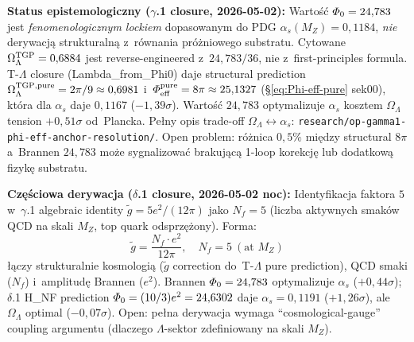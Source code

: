 \begin{proposition}
\medskip\noindent
\textbf{Status epistemologiczny ($\gamma$.1 closure, 2026-05-02):}
Warto\'s\'c $\PhiZero = 24{,}783$ jest \emph{fenomenologicznym lockiem}
dopasowanym do PDG $\alpha_s(M_Z) = 0{,}1184$, \emph{nie} derywacj\k{a}
strukturaln\k{a} z~r\'ownania pr\'o\.zniowego substratu.
Cytowane $\Omega_\Lambda^{\rm TGP} = 0{,}6884$ jest reverse-engineered
z~$24{,}783/36$, nie z~first-principles formula.
T-$\Lambda$ closure (Lambda\_from\_Phi0) daje structural prediction
$\Omega_\Lambda^{\rm TGP,pure} = 2\pi/9 \approx 0{,}6981$
i~$\Phi_{\mathrm{eff}}^{\rm pure} = 8\pi \approx 25{,}1327$
(\S\ref{eq:Phi-eff-pure} sek00), kt\'ora dla $\alpha_s$ daje
$0{,}1167$ ($-1{,}39\sigma$). Warto\'s\'c $24{,}783$ optymalizuje
$\alpha_s$ kosztem $\Omega_\Lambda$ tension $+0{,}51\sigma$ od~Plancka.
Pe\l{}ny opis trade-off $\Omega_\Lambda \leftrightarrow \alpha_s$:
\texttt{research/op-gamma1-phi-eff-anchor-resolution/}.
\textsf{Open problem: r\'o\.znica $0{,}5\%$ mi\k{e}dzy structural $8\pi$
a~Brannen $24{,}783$ mo\.ze sygnalizowa\'c brakuj\k{a}c\k{a} 1-loop
korekcj\k{e} lub dodatkow\k{a} fizyk\k{e} substratu.}

\medskip\noindent
\textbf{Cz\k{e}\'sciowa derywacja ($\delta$.1 closure, 2026-05-02 noc):}
Identyfikacja faktora $5$ w~$\gamma$.1 algebraic identity
$\tilde{g} = 5e^2/(12\pi)$ jako $N_f = 5$ (liczba aktywnych smak\'ow
QCD na skali $M_Z$, top quark odsprz\k{e}\.zony). Forma:
\begin{equation}
\tilde{g} = \frac{N_f \cdot e^2}{12\pi}, \quad N_f = 5\ (\text{at }M_Z)
\label{eq:g-tilde-Nf}
\end{equation}
\l{}\k{a}czy strukturalnie kosmologi\k{a} ($\tilde{g}$ correction
do~T-$\Lambda$ pure prediction), QCD smaki ($N_f$) i~amplitud\k{e}
Brannen ($e^2$). Brannen $\PhiZero = 24{,}783$ optymalizuje
$\alpha_s$ ($+0{,}44\sigma$); $\delta$.1 H\_NF prediction $\PhiZero =
(10/3)e^2 = 24{,}6302$ daje $\alpha_s = 0{,}1191$ ($+1{,}26\sigma$),
ale $\Omega_\Lambda$ optimal ($-0{,}07\sigma$).
\textsf{Open: pe\l{}na derywacja wymaga ``cosmological-gauge'' coupling
argumentu (dlaczego $\Lambda$-sektor zdefiniowany na skali $M_Z$).}


\end{proposition}
